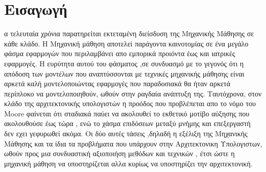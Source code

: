 \chapter{Εισαγωγή} 
α τελευταία χρόνια παρατηρείται εκτεταμένη διείσδυση της Μηχανικής Μάθησης σε κάθε κλάδο. Η Μηχανική μάθηση αποτελεί παράγοντα καινοτομίας σε ένα μεγάλο φάσμα εφαρμογών που περιλαμβάνει απο εμπορικά προιόντα έως και ιατρικές εφαρμογές. Η ευρύτητα αυτού του φάσματος ,σε συνδυασμό με το γεγονός ότι η απόδοση των μοντέλων που αναπτύσσονται με τεχνικές μηχανικής μάθησης είναι αρκετά καλή μοντελοποιώντας εφαρμογές που παραδοσιακά θα ήταν αρκετά περίπλοκο να μοντελοποιηθούν, ωθούν στην ραγδαία ανάπτυξη της. Ταυτόχρονα, στον κλάδο της αρχιτεκτονικής υπολογιστών η προόδος που προβλέπεται απο το νόμο του Moore φαίνεται ότι σταδιακά παύει να ακολουθεί το εκθετικό μοτίβο αύξησης που ακολουθούσε έως τώρα , ενώ το χάσμα επιδόσεων μεταξύ μνήμης και επεξεργαστή δεν εχει γεφυρωθεί ακόμα. Οι δύο αυτές τάσεις ,δηλαδή η εξέλιξη της Μηχανικής Μάθησης και τα ίδια τα προβλήματα που υπάρχουν στην Αρχιτεκτονικη Υπολογιστων, ωθούν προς μια συνδυαστική αξιοποιήση μεθόδων και τεχνικών , έτσι ώστε η μηχανική μάθηση να υποστηρίζεται αλλα κυρίως να υποστηρίζει την αρχιτεκτονική.


